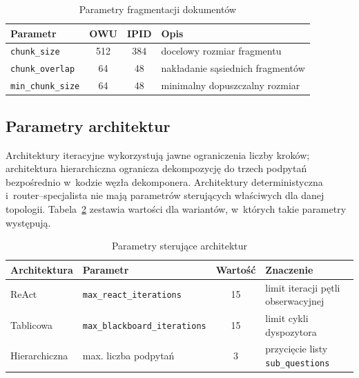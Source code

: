   \begin{table}[H]
    \caption{Parametry fragmentacji dokumentów}\label{tab:parametry-fragmentacji}
    \centering
    \small
    \renewcommand{\arraystretch}{1.3}
    \begin{tabular}{@{} l c c l @{}}
      \toprule
      \textbf{Parametr}
      & \textbf{OWU}
      & \textbf{IPID}
      & \textbf{Opis}                                          \\
      \midrule
      \texttt{chunk\_size}      & 512           & 384 & docelowy rozmiar fragmentu       \\
      \texttt{chunk\_overlap}   & 64            & 48  & nakładanie sąsiednich fragmentów \\
      \texttt{min\_chunk\_size} & 64            & 48  & minimalny dopuszczalny rozmiar   \\
      \bottomrule
    \end{tabular}
  \end{table}

  \subsection{Parametry architektur}\label{subsec:parametry-architektur}

  Architektury iteracyjne wykorzystują jawne ograniczenia liczby kroków;
  architektura hierarchiczna ogranicza dekompozycję do trzech podpytań
  bezpośrednio w~kodzie węzła dekomponera. Architektury deterministyczna
  i~router--specjalista nie mają parametrów sterujących właściwych dla danej
  topologii. Tabela~\ref{tab:parametry-architektur} zestawia wartości dla
  wariantów, w~których takie parametry występują.

  \begin{table}[H]
    \caption{Parametry sterujące architektur}\label{tab:parametry-architektur}
    \centering
    \small
    \renewcommand{\arraystretch}{1.3}
    \begin{tabular}{@{} l l c l @{}}
      \toprule
      \textbf{Architektura}
      & \textbf{Parametr}
      & \textbf{Wartość}
      & \textbf{Znaczenie}                            \\
      \midrule
      ReAct
      & \texttt{max\_react\_iterations}          & 15
      & limit iteracji pętli obserwacyjnej            \\
      Tablicowa
      & \texttt{max\_blackboard\_iterations}     & 15
      & limit cykli dyspozytora                       \\
      Hierarchiczna
      & max. liczba podpytań                     & 3
      & przycięcie listy \texttt{sub\_questions}      \\
      \bottomrule
    \end{tabular}
  \end{table}

